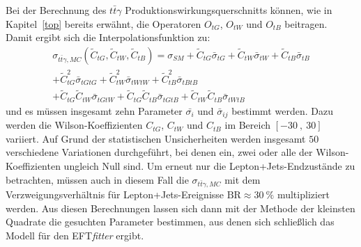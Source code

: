 Bei der Berechnung des $t\bar{t}\gamma$ Produktionswirkungsquerschnitts können, wie in Kapitel~\ref{top} bereits erwähnt, die Operatoren $O_{tG}$, $O_{tW}$ und $O_{tB}$ beitragen. Damit ergibt sich die Interpolationsfunktion zu:
\begin{align}
  \sigma_{t\bar{t}\gamma, MC}({\tilde{C}_{tG}, \tilde{C}_{tW}, \tilde{C}_{tB}}) = \sigma_{SM} + \tilde{C}_{tG}\bar{\sigma}_{tG} + \tilde{C}_{tW}\bar{\sigma}_{tW} + \tilde{C}_{tB}\bar{\sigma}_{tB}\\ \nonumber
  + \tilde{C}_{tG}^2\bar{\sigma}_{tGtG} + \tilde{C}_{tW}^2\bar{\sigma}_{tWtW} + \tilde{C}_{tB}^2\bar{\sigma}_{tBtB}\\
  + \tilde{C}_{tG} \tilde{C}_{tW}\bar{\sigma}_{tGtW} + \tilde{C}_{tG} \tilde{C}_{tB}\bar{\sigma}_{tGtB} + \tilde{C}_{tW} \tilde{C}_{tB}\bar{\sigma}_{tWtB} \nonumber
\end{align}
und es müssen insgesamt zehn Parameter $\bar{\sigma_i}$ und $\bar{\sigma}_{ij}$ bestimmt werden. Dazu werden die Wilson-Koeffizienten $C_{tG}$, $C_{tW}$ und $C_{tB}$ im Bereich $[-30~,~30]$ variiert. Auf Grund der statistischen Unsicherheiten werden insgesamt $50$ verschiedene Variationen durchgeführt, bei denen ein, zwei oder alle der Wilson-Koeffizienten ungleich Null sind.
Um erneut nur die Lepton+Jets-Endzustände zu betrachten, müssen auch in diesem Fall die $\sigma_{t\bar{t}\gamma, MC}$ mit dem Verzweigungsverhältnis für Lepton+Jets-Ereignisse $\mathrm{BR} \approx \SI{30}{\percent}$ multipliziert werden.
Aus diesen Berechnungen lassen sich dann mit der Methode der kleinsten Quadrate die gesuchten Parameter bestimmen, aus denen sich schließlich das Modell für den EFT\textit{fitter} ergibt.



